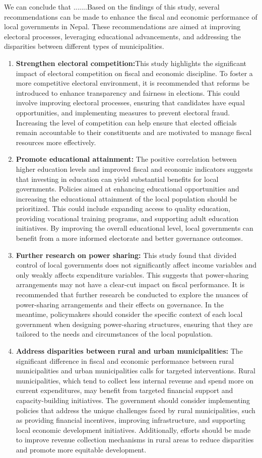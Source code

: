 We can conclude that .......Based on the findings of this study, several recommendations can be made to enhance the fiscal and economic performance of local governments in Nepal. These recommendations are aimed at improving electoral processes, leveraging educational advancements, and addressing the disparities between different types of municipalities.
\begin{enumerate}[label=\roman*.]
    \item  \textbf{Strengthen electoral competition:}This study highlights the significant impact of electoral competition on fiscal and economic discipline. To foster a more competitive electoral environment, it is recommended that reforms be introduced to enhance transparency and fairness in elections. This could involve improving electoral processes, ensuring that candidates have equal opportunities, and implementing measures to prevent electoral fraud. Increasing the level of competition can help ensure that elected officials remain accountable to their constituents and are motivated to manage fiscal resources more effectively.
     \item \textbf{Promote educational attainment:} The positive correlation between higher education levels and improved fiscal and economic indicators suggests that investing in education can yield substantial benefits for local governments. Policies aimed at enhancing educational opportunities and increasing the educational attainment of the local population should be prioritized. This could include expanding access to quality education, providing vocational training programs, and supporting adult education initiatives. By improving the overall educational level, local governments can benefit from a more informed electorate and better governance outcomes.
   \item \textbf{Further research on power sharing:} This study found that divided control of local governments does not significantly affect income variables and only weakly affects expenditure variables. This suggests that power-sharing arrangements may not have a clear-cut impact on fiscal performance. It is recommended that further research be conducted to explore the nuances of power-sharing arrangements and their effects on governance. In the meantime, policymakers should consider the specific context of each local government when designing power-sharing structures, ensuring that they are tailored to the needs and circumstances of the local population. 
  \item \textbf{Address disparities between rural and urban municipalities:} The significant difference in fiscal and economic performance between rural municipalities and urban municipalities calls for targeted interventions. Rural municipalities, which tend to collect less internal revenue and spend more on current expenditures, may benefit from targeted financial support and capacity-building initiatives. The government should consider implementing policies that address the unique challenges faced by rural municipalities, such as providing financial incentives, improving infrastructure, and supporting local economic development initiatives. Additionally, efforts should be made to improve revenue collection mechanisms in rural areas to reduce disparities and promote more equitable development. 

\end{enumerate}
